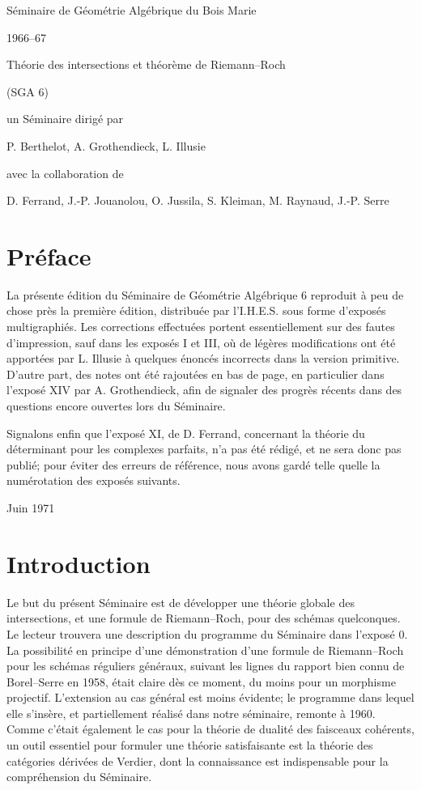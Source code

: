 \documentclass[11pt]{article}
\begin{document}
\begin{center}
{\Large Séminaire de Géométrie Algébrique du Bois Marie}\par
{\large 1966--67}\par
\vspace{1.5em}
{\Large Théorie des intersections et théorème de Riemann--Roch}\par
{\large (SGA 6)}\par
\vspace{1.5em}
un Séminaire dirigé par\par
P. Berthelot, A. Grothendieck, L. Illusie\par
avec la collaboration de\par
D. Ferrand, J.-P. Jouanolou, O. Jussila, S. Kleiman, M. Raynaud, J.-P. Serre
\end{center}

\section*{Préface}
La présente édition du Séminaire de Géométrie Algébrique 6 reproduit à peu de chose près la première édition, distribuée par l'I.H.E.S. sous forme d'exposés multigraphiés. Les corrections effectuées portent essentiellement sur des fautes d'impression, sauf dans les exposés I et III, où de légères modifications ont été apportées par L. Illusie à quelques énoncés incorrects dans la version primitive. D'autre part, des notes ont été rajoutées en bas de page, en particulier dans l'exposé XIV par A. Grothendieck, afin de signaler des progrès récents dans des questions encore ouvertes lors du Séminaire.

Signalons enfin que l'exposé XI, de D. Ferrand, concernant la théorie du déterminant pour les complexes parfaits, n'a pas été rédigé, et ne sera donc pas publié; pour éviter des erreurs de référence, nous avons gardé telle quelle la numérotation des exposés suivants.

\begin{flushright}Juin 1971\end{flushright}

\section*{Introduction}
Le but du présent Séminaire est de développer une théorie globale des intersections, et une formule de Riemann--Roch, pour des schémas quelconques. Le lecteur trouvera une description du programme du Séminaire dans l'exposé 0. La possibilité en principe d'une démonstration d'une formule de Riemann--Roch pour les schémas réguliers généraux, suivant les lignes du rapport bien connu de Borel--Serre en 1958, était claire dès ce moment, du moins pour un morphisme projectif. L'extension au cas général est moins évidente; le programme dans lequel elle s'insère, et partiellement réalisé dans notre séminaire, remonte à 1960. Comme c'était également le cas pour la théorie de dualité des faisceaux cohérents, un outil essentiel pour formuler une théorie satisfaisante est la théorie des catégories dérivées de Verdier, dont la connaissance est indispensable pour la compréhension du Séminaire.
\end{document}
